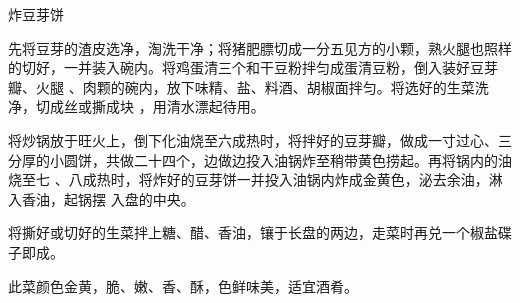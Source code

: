 \begin{recipe}{炸豆芽饼}

\ingredients


\cooking

\step 先将豆芽的渣皮选净，淘洗干净；将猪肥膘切成一分五见方的小颗，熟火腿也照样
的切好，一并装入碗内。将鸡蛋清三个和干豆粉拌匀成蛋清豆粉，倒入装好豆芽瓣、火腿
、肉颗的碗内，放下味精、盐、料酒、胡椒面拌匀。将选好的生菜洗净，切成丝或撕成块
，用清水漂起待用。

\step 将炒锅放于旺火上，倒下化油烧至六成热时，将拌好的豆芽瓣，做成一寸过心、三
分厚的小圆饼，共做二十四个，边做边投入油锅炸至稍带黄色捞起。再将锅内的油烧至七
、八成热时，将炸好的豆芽饼一并投入油锅内炸成金黄色，泌去余油，淋入香油，起锅摆
入盘的中央。

\step 将撕好或切好的生菜拌上糖、醋、香油，镶于长盘的两边，走菜时再兑一个椒盐碟
子即成。

\features

此菜颜色金黄，脆、嫩、香、酥，色鲜味美，适宜酒肴。

\end{recipe}

